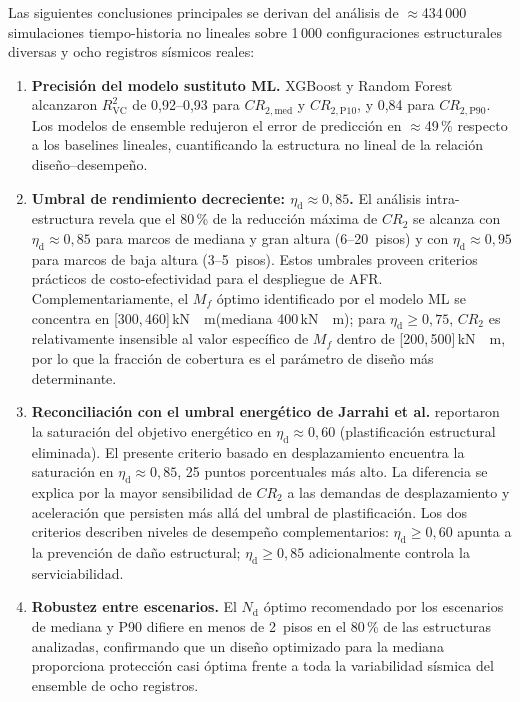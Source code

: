 \documentclass[preprint,12pt,authoryear]{elsarticle}
\newcommand{\CR}[1]{CR_{2,\text{#1}}}
\newcommand{\Rsq}{R^{2}_{\mathrm{VC}}}
\newcommand{\nd}{N_{\mathrm{d}}}
\newcommand{\etad}{\eta_{\mathrm{d}}}
\newcommand{\Mf}{M_{\!f}}
\newcommand{\KM}{\,\si{kN{\cdot}m}}
\begin{document}
Las siguientes conclusiones principales se derivan del análisis de
$\approx$434\,000 simulaciones tiempo-historia no lineales sobre 1\,000
configuraciones estructurales diversas y ocho registros sísmicos reales:

\begin{enumerate}

\item \textbf{Precisión del modelo sustituto ML.}
XGBoost y Random Forest alcanzaron $\Rsq$ de 0{,}92--0{,}93 para $\CR{med}$
y $\CR{P10}$, y 0{,}84 para $\CR{P90}$. Los modelos de ensemble redujeron el
error de predicción en $\approx$49\,\% respecto a los baselines lineales,
cuantificando la estructura no lineal de la relación diseño--desempeño.

\item \textbf{Umbral de rendimiento decreciente: $\etad \approx 0{,}85$.}
El análisis intra-estructura revela que el 80\,\% de la reducción máxima de
$CR_2$ se alcanza con $\etad \approx 0{,}85$ para marcos de mediana y gran
altura (6--20~pisos) y con $\etad \approx 0{,}95$ para marcos de baja altura
(3--5~pisos). Estos umbrales proveen criterios prácticos de costo-efectividad
para el despliegue de AFR. Complementariamente, el $\Mf$ óptimo identificado
por el modelo ML se concentra en [300,\,460]\KM (mediana 400\KM); para
$\etad \geq 0{,}75$, $CR_2$ es relativamente insensible al valor específico
de $\Mf$ dentro de [200,\,500]\KM, por lo que la fracción de cobertura es el
parámetro de diseño más determinante.

\item \textbf{Reconciliación con el umbral energético de Jarrahi et al.}
\citet{Jarrahi2020sdee} reportaron la saturación del objetivo energético en
$\etad \approx 0{,}60$ (plastificación estructural eliminada). El presente
criterio basado en desplazamiento encuentra la saturación en
$\etad \approx 0{,}85$, 25 puntos porcentuales más alto. La diferencia se
explica por la mayor sensibilidad de $CR_2$ a las demandas de desplazamiento
y aceleración que persisten más allá del umbral de plastificación. Los dos
criterios describen niveles de desempeño complementarios: $\etad \geq 0{,}60$
apunta a la prevención de daño estructural; $\etad \geq 0{,}85$ adicionalmente
controla la serviciabilidad.

\item \textbf{Robustez entre escenarios.}
El $\nd$ óptimo recomendado por los escenarios de mediana y P90 difiere en
menos de 2~pisos en el 80\,\% de las estructuras analizadas, confirmando que
un diseño optimizado para la mediana proporciona protección casi óptima frente
a toda la variabilidad sísmica del ensemble de ocho registros.


\end{enumerate}
\end{document}
